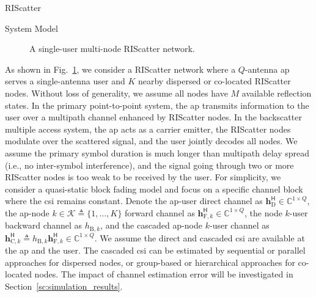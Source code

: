 \begin{section}{RIScatter}
	\begin{subsection}{System Model}
		\label{sc:system_model_4}
		\begin{figure}[H]
			\centering
			\def\svgwidth{0.7\columnwidth}
			
			\caption{A single-user multi-node RIScatter network.}
			\label{fg:riscatter_network}
		\end{figure}
		As shown in Fig.~\ref{fg:riscatter_network}, we consider a RIScatter network where a $Q$-antenna \gls{ap} serves a single-antenna user and $K$ nearby dispersed or co-located RIScatter nodes.
		Without loss of generality, we assume all nodes have $M$ available reflection states.
		In the primary point-to-point system, the \gls{ap} transmits information to the user over a multipath channel enhanced by RIScatter nodes.
		In the backscatter multiple access system, the \gls{ap} acts as a carrier emitter, the RIScatter nodes modulate over the scattered signal, and the user jointly decodes all nodes.
		We assume the primary symbol duration is much longer than multipath delay spread (i.e., no inter-symbol interference), and the signal going through two or more RIScatter nodes is too weak to be received by the user.
		For simplicity, we consider a quasi-static block fading model and focus on a specific channel block where the \gls{csi} remains constant.
		Denote the \gls{ap}-user direct channel as $\mathbf{h}_{\text{D}}^\mathsf{H} \in \mathbb{C}^{1 \times Q}$, the \gls{ap}-node $k \in \mathcal{K} \triangleq \{1,\ldots,K\}$ forward channel as $\mathbf{h}_{\text{F},k}^\mathsf{H} \in \mathbb{C}^{1 \times Q}$, the node $k$-user backward channel as $h_{\text{B},k}$, and the cascaded \gls{ap}-node $k$-user channel as $\mathbf{h}_{\text{C},k}^\mathsf{H} \triangleq h_{\text{B},k} \mathbf{h}_{\text{F},k}^\mathsf{H} \in \mathbb{C}^{1 \times Q}$.
		We assume the direct and cascaded \gls{csi} are available at the \gls{ap} and the user.
		The cascaded \gls{csi} can be estimated by sequential \cite{Bharadia2015,Yang2015b,Guo2019g} or parallel \cite{Jin2021a} approaches for dispersed nodes, or group-based \cite{Zheng2019} or hierarchical \cite{You2019} approaches for co-located nodes. The impact of channel estimation error will be investigated in Section~\ref{sc:simulation_results}.


\end{subsection}
\end{section}
